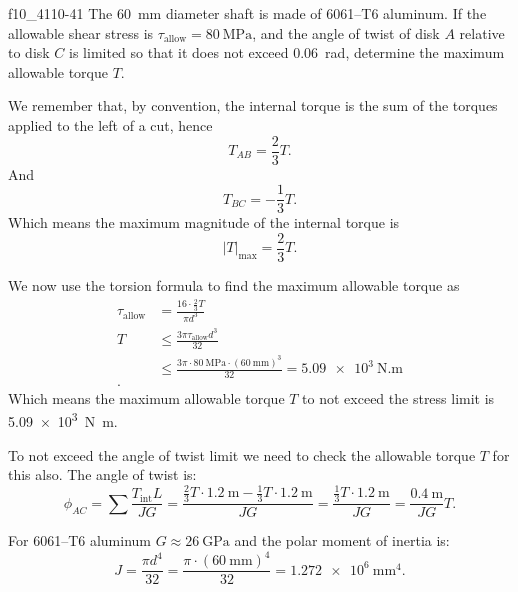 
\begin{problemwithimage}{f10_41}{10-41}
  The \qty{60}{\mm} diameter shaft is made of 6061--T6 aluminum.
  If the allowable shear stress is $\tau_{\mathrm{allow}} = \qty{80}{\MPa}$, and the angle of twist of disk $A$ relative to disk $C$ is limited so that it does not exceed \qty{0,06}{rad}, determine the maximum allowable torque $T$.
\end{problemwithimage}

\begin{derivation}
  We remember that, by convention, the internal torque is the sum of the torques applied to the left of a cut, hence
  \begin{equation*}
    T_{AB} = \frac{2}{3}T
  .\end{equation*}
  And
  \begin{equation*}
    T_{BC} = - \frac{1}{3}T
  .\end{equation*}
  Which means the maximum magnitude of the internal torque is
  \begin{equation*}
    \left| T \right|_{\mathrm{max}} = \frac{2}{3}T
  .\end{equation*}
  
  We now use the torsion formula to find the maximum allowable torque as
  \begin{align*}
    \tau_{\mathrm{allow}} &= \frac{16 \cdot \frac{2}{3} T}{\pi d^3} \\
    T &\leq  \frac{3\pi \tau_{\mathrm{allow}} d^3}{32} \\
    &\leq \frac{3\pi \cdot \qty{80}{\MPa} \cdot \left( \qty{60}{\mm}  \right)^3}{32}  = \qty{5.09e3}{\N.\m}\\
  .\end{align*}
  Which means the maximum allowable torque $T$ to not exceed the stress limit is \qty{5,09e3}{\N.\m}.

  To not exceed the angle of twist limit we need to check the allowable torque $T$ for this also.
  The angle of twist is:
  \begin{equation*}
    \phi_{AC} = \sum \frac{T_{\mathrm{int}} L}{JG} = \frac{\frac{2}{3}T \cdot \qty{1,2}{\m} - \frac{1}{3} T \cdot \qty{1,2}{\m} }{JG} = \frac{\frac{1}{3}T \cdot \qty{1,2}{\m}}{JG} = \frac{\qty{0,4}{\m}}{JG} T
  .\end{equation*}
  
  For 6061--T6 aluminum $G \approx \qty{26}{\GPa}$ and the polar moment of inertia is:
  \begin{equation*}
    J = \frac{\pi d^{4}}{32} = \frac{\pi \cdot \left( \qty{60}{\mm}  \right)^{4}}{32} = \qty{1,272e6}{\mm^4}
  .\end{equation*}
  

\end{derivation}
